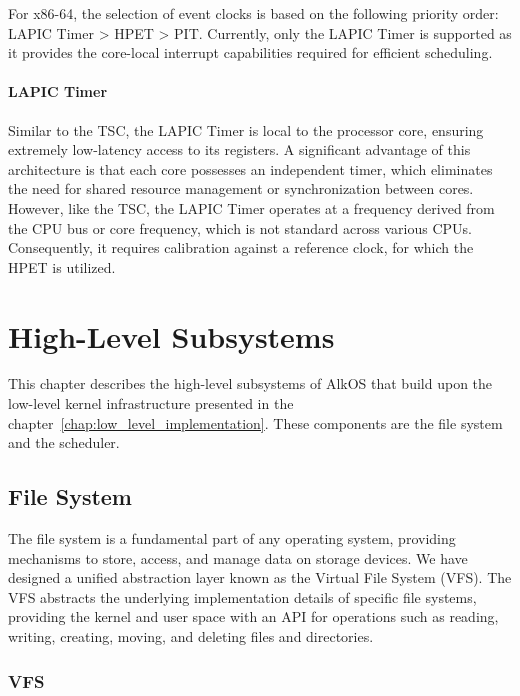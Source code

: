 \documentclass[a4paper,10pt,twoside]{report}
\theoremstyle{definition}
\begin{document}
For x86-64, the selection of event clocks is based on the following priority order: LAPIC Timer > HPET > PIT. Currently, only the LAPIC Timer is supported as it provides the core-local interrupt capabilities required for efficient scheduling.

\subsubsection{LAPIC Timer}
Similar to the TSC, the LAPIC Timer is local to the processor core, ensuring extremely low-latency access to its registers. A significant advantage of this architecture is that each core possesses an independent timer, which eliminates the need for shared resource management or synchronization between cores. However, like the TSC, the LAPIC Timer operates at a frequency derived from the CPU bus or core frequency, which is not standard across various CPUs. Consequently, it requires calibration against a reference clock, for which the HPET is utilized.


\chapter{High-Level Subsystems}
\label{chap:high_level_subsystems}

This chapter describes the high-level subsystems of AlkOS that build upon the low-level kernel infrastructure presented in the chapter~\ref{chap:low_level_implementation}. These components are the file system and the scheduler. 

\section{File System}
\label{section:fs}

The file system is a fundamental part of any operating system, providing mechanisms to store, access, and manage data on storage devices. We have designed a unified abstraction layer known as the Virtual File System (VFS). The VFS abstracts the underlying implementation details of specific file systems, providing the kernel and user space with an API for operations such as reading, writing, creating, moving, and deleting files and directories.

\subsection{VFS}
\end{document}
